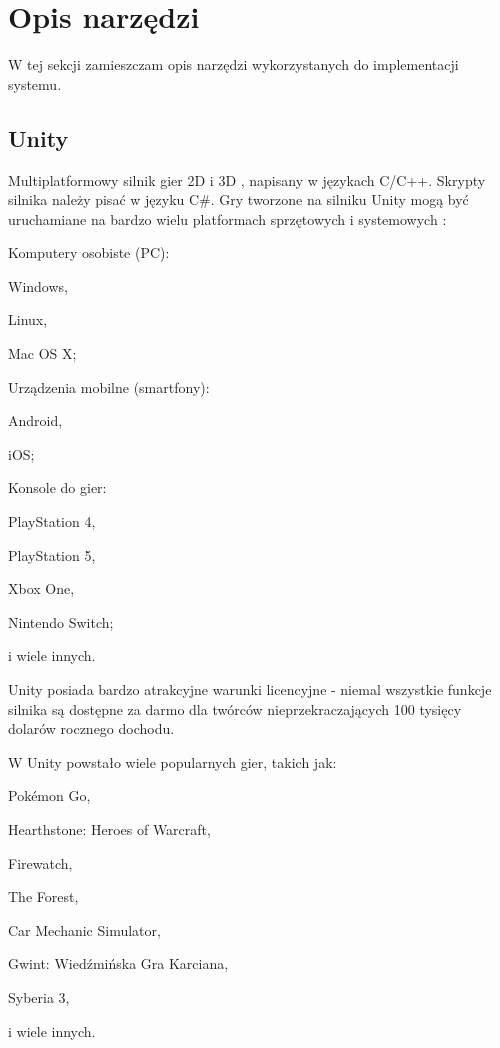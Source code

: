 \section{Opis narzędzi}
W tej sekcji zamieszczam opis narzędzi wykorzystanych do implementacji systemu.
\subsection{Unity}
Multiplatformowy silnik gier 2D i 3D \cite{unity:opis}, napisany w językach C/C++.
Skrypty silnika należy pisać w języku C\#.
Gry tworzone na silniku Unity mogą być uruchamiane na bardzo wielu platformach sprzętowych i systemowych \cite{unity:buildTargets}:
\begin{enumerate*}
\item Komputery osobiste (PC):
\begin{itemize*}
\item Windows,
\item Linux,
\item Mac OS X;
\end{itemize*}
\item Urządzenia mobilne (smartfony):
\begin{itemize*}
\item Android,
\item iOS;
\end{itemize*}
\item Konsole do gier:
\begin{itemize*}
\item PlayStation 4,
\item PlayStation 5,
\item Xbox One,
\item Nintendo Switch;
\end{itemize*}
\item i wiele innych.
\end{enumerate*}

Unity posiada bardzo atrakcyjne warunki licencyjne - niemal wszystkie funkcje silnika są dostępne za darmo dla twórców nieprzekraczających 100 tysięcy dolarów rocznego dochodu.

W Unity powstało wiele popularnych gier, takich jak:
\begin{enumerate*}
\item Pokémon Go,
\item Hearthstone: Heroes of Warcraft,
\item Firewatch,
\item The Forest,
\item Car Mechanic Simulator,
\item Gwint: Wiedźmińska Gra Karciana,
\item Syberia 3,
\item i wiele innych.
\end{enumerate*}

